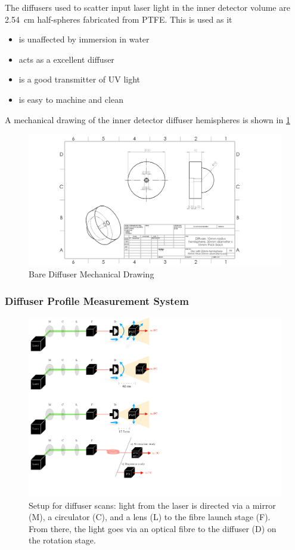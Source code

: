 \documentclass[a4paper,11pt]{article}
\begin{document}
The diffusers used to scatter input laser light in the inner detector volume are 2.54~cm half-spheres fabricated from PTFE. This is used as it
\begin{itemize}
\item is unaffected by immersion in water
\item acts as a excellent diffuser
\item is a good transmitter of UV light
\item is easy to machine and clean
\end{itemize}

A mechanical drawing of the inner detector diffuser hemispheres is shown in \cref{fig:Bare_Diffuser_Mechanical}

\begin{figure}
    \centering
    \includegraphics[width=\textwidth]{BareDiffuser.PNG}
    \caption{Bare Diffuser Mechanical Drawing}
    \label{fig:Bare_Diffuser_Mechanical}
\end{figure}

\subsubsection{Diffuser Profile Measurement System}

\begin{figure}[t]
    \centering
    \includegraphics[width=\textwidth]{diffuser_setup_new.pdf}
    \caption{Setup for diffuser scans: light from the laser is directed via a mirror (M), a circulator (C), and a lens (L) to the fibre launch stage (F). From there, the light goes via an optical fibre to the diffuser (D) on the rotation stage.}
    \label{fig:setup}
\end{figure}
\end{document}
